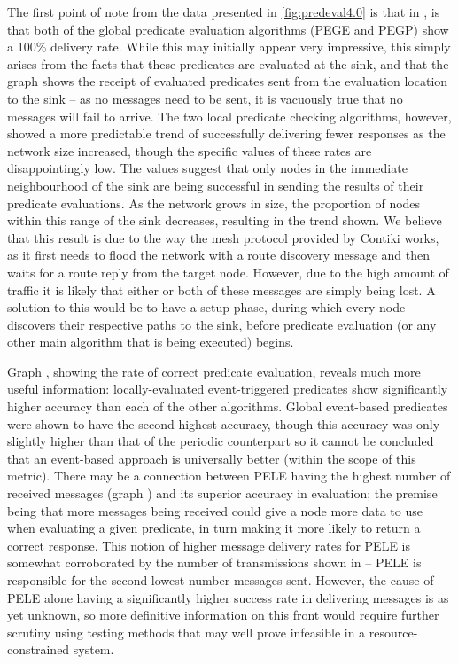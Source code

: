 The first point of note from the data presented in \autoref{fig:predeval4.0} is that in , is that both of the global predicate evaluation algorithms (PEGE and PEGP) show a 100\% delivery rate. While this may initially appear very impressive, this simply arises from the facts that these predicates are evaluated at the sink, and that the graph shows the receipt of evaluated predicates sent from the evaluation location to the sink -- as no messages need to be sent, it is vacuously true that no messages will fail to arrive. The two local predicate checking algorithms, however, showed a more predictable trend of successfully delivering fewer responses as the network size increased, though the specific values of these rates are disappointingly low. The values suggest that only nodes in the immediate neighbourhood of the sink are being successful in sending the results of their predicate evaluations. As the network grows in size, the proportion of nodes within this range of the sink decreases, resulting in the trend shown. We believe that this result is due to the way the mesh protocol provided by Contiki works, as it first needs to flood the network with a route discovery message and then waits for a route reply from the target node. However, due to the high amount of traffic it is likely that either or both of these messages are simply being lost. A solution to this would be to have a setup phase, during which every node discovers their respective paths to the sink, before predicate evaluation (or any other main algorithm that is being executed) begins.

Graph , showing the rate of correct predicate evaluation, reveals much more useful information: locally-evaluated event-triggered predicates show significantly higher accuracy than each of the other algorithms. Global event-based predicates were shown to have the second-highest accuracy, though this accuracy was only slightly higher than that of the periodic counterpart so it cannot be concluded that an event-based approach is universally better (within the scope of this metric). There may be a connection between PELE having the highest number of received messages (graph ) and its superior accuracy in evaluation; the premise being that more messages being received could give a node more data to use when evaluating a given predicate, in turn making it more likely to return a correct response. This notion of higher message delivery rates for PELE is somewhat corroborated by the number of transmissions shown in  -- PELE is responsible for the second lowest number messages sent. However, the cause of PELE alone having a significantly higher success rate in delivering messages is as yet unknown, so more definitive information on this front would require further scrutiny using testing methods that may well prove infeasible in a resource-constrained system.

